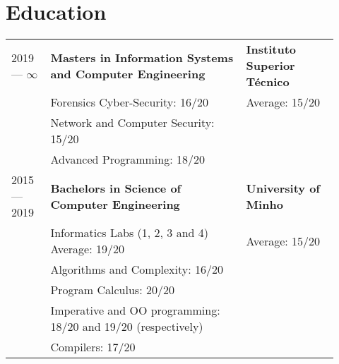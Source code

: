 \documentclass{article}
\begin{document}
\begin{tabular}{p{0.11\linewidth}p{0.73\linewidth}l}
\end{tabular}

\section{Education}

\begin{tabular}{p{0.11\linewidth}p{0.55\linewidth}p{0.26\linewidth}}

    2019 --- $\infty$ &
        \textbf{Masters in Information Systems and Computer Engineering}
    &
        \textbf{Instituto Superior Técnico}
    \\
    & Forensics Cyber-Security: 16/20 & Average: 15/20 \\
    & Network and Computer Security: 15/20 &\\
    & Advanced Programming: 18/20 &\\

    2015 --- 2019
    &
        \textbf{Bachelors in Science of Computer Engineering}
    &
        \textbf{University of Minho}
    \\
    & Informatics Labs (1, 2, 3 and 4) Average: 19/20 & Average: 15/20 \\
    & Algorithms and Complexity: 16/20 & \\
    & Program Calculus: 20/20 & \\
    & Imperative and OO programming: 18/20 and 19/20 (respectively) &\\
    & Compilers: 17/20 &\\

\end{tabular}


\end{document}
